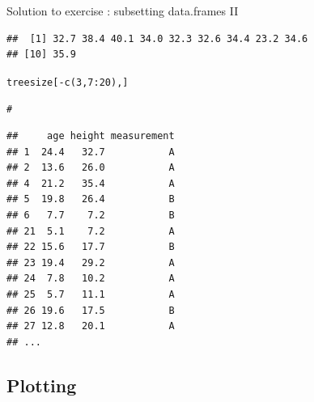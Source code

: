 \documentclass[xcolor=table,       handout,    xcolor=dvipsnames]{beamer}\usepackage[]{graphicx}\usepackage[]{color}
\makeatletter
\newcommand{\hlnum}[1]{\textcolor[rgb]{0,0,0}{#1}}
\newcommand{\hlcom}[1]{\textcolor[rgb]{0,0.392,0}{\textit{#1}}}
\newcommand{\hlopt}[1]{\textcolor[rgb]{0,0,0}{#1}}
\newcommand{\hlstd}[1]{\textcolor[rgb]{0,0,0}{#1}}
\newcommand{\hlkwd}[1]{\textcolor[rgb]{0,0,1}{#1}}
\newenvironment{kframe}{%
 \def\at@end@of@kframe{}%
 \ifinner\ifhmode%
  \def\at@end@of@kframe{\end{minipage}}%
  \begin{minipage}{\columnwidth}%
 \fi\fi%
 \def\FrameCommand##1{\hskip\@totalleftmargin \hskip-\fboxsep
 \colorbox{shadecolor}{##1}\hskip-\fboxsep
     \hskip-\linewidth \hskip-\@totalleftmargin \hskip\columnwidth}%
 \MakeFramed {\advance\hsize-\width
   \@totalleftmargin\z@ \linewidth\hsize
   \@setminipage}}%
 {\par\unskip\endMakeFramed%
 \at@end@of@kframe}
\newenvironment{knitrout}{}{} %
\newcounter{exercisecount}
\makeatother
\begin{document}
\begin{frame}[fragile]{Solution to exercise : subsetting data.frames II}
\begin{knitrout}\scriptsize
{}\color{fgcolor}\begin{kframe}
\begin{verbatim}
##  [1] 32.7 38.4 40.1 34.0 32.3 32.6 34.4 23.2 34.6
## [10] 35.9
\end{verbatim}
\end{kframe}
\end{knitrout}
\begin{knitrout}\scriptsize
{}\color{fgcolor}\begin{kframe}
\begin{alltt}
\hlstd{treesize[} \hlopt{-}\hlkwd{c}\hlstd{(}\hlnum{3}\hlstd{,}\hlnum{7}\hlopt{:}\hlnum{20}\hlstd{) , ]}

\hlcom{#}
\end{alltt}
\end{kframe}
\end{knitrout}
\vspace{-3em}
\begin{knitrout}\scriptsize
{}\color{fgcolor}\begin{kframe}
\begin{verbatim}
##     age height measurement
## 1  24.4   32.7           A
## 2  13.6   26.0           A
## 4  21.2   35.4           A
## 5  19.8   26.4           B
## 6   7.7    7.2           B
## 21  5.1    7.2           A
## 22 15.6   17.7           B
## 23 19.4   29.2           A
## 24  7.8   10.2           A
## 25  5.7   11.1           A
## 26 19.6   17.5           B
## 27 12.8   20.1           A
## ...
\end{verbatim}
\end{kframe}
\end{knitrout}
\end{frame}

\subsection{Plotting}
\end{document}
